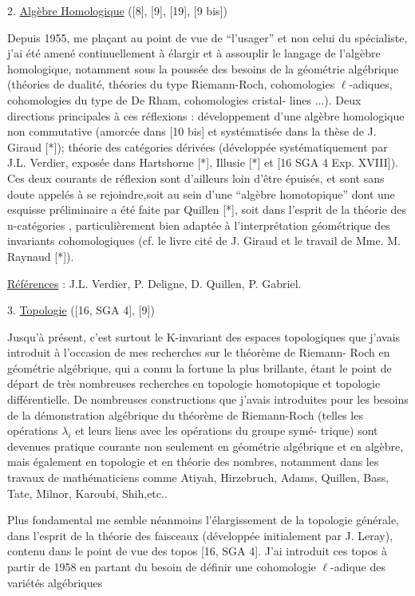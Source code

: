 
2. \uline{Algèbre Homologique} ([8], [9], [19], [9 bis])

Depuis 1955, me plaçant au point de vue de ``l'usager'' et non celui
du spécialiste, j'ai été amené continuellement à élargir et à assouplir le
langage de l'algèbre homologique, notamment sous la poussée des besoins de la
géométrie algébrique (théories de dualité, théories du type Riemann-Roch,
cohomologies $\ell$-adiques, cohomologies du type de De Rham, cohomologies cristal-%
lines ...). Deux directions principales à ces réflexions  : développement d'une
algèbre homologique non commutative (amorcée dans [10 bis] et systématisée
dans la thèse de J. Giraud [*]); théorie des catégories dérivées (développée
systématiquement par J.L. Verdier, exposée dans Hartshorne [*], Illusie [*]
et [16 SGA 4 Exp. XVIII]). Ces deux courants de réflexion sont d'ailleurs loin
d'être épuisés, et sont sans doute appelés à se rejoindre,soit au sein d'une
``algèbre homotopique'' dont une esquisse préliminaire a été faite par Quillen
[*], soit dans l'esprit de la théorie des n-catégories , particulièrement bien
adaptée à l'interprétation géométrique des invariants cohomologiques (cf. le
livre cité de J. Giraud et le travail de Mme. M. Raynaud [*]).

\uline{Références} : J.L. Verdier, P. Deligne, D. Quillen, P. Gabriel.

3. \uline{Topologie} ([16, SGA 4], [9])

Jusqu'à présent, c'est surtout le K-invariant des espaces topologiques
que j'avais introduit à l'occasion de mes recherches sur le théorème de Riemann-%
Roch en géométrie algébrique, qui a connu la fortune\unsure{,} la plus brillante, étant
le point de départ de très nombreuses recherches en topologie homotopique et
topologie différentielle. De nombreuses constructions que j'avais introduites
pour les besoins de la démonstration algébrique du théorème de Riemann-Roch
(telles les opérations  $\lambda_i$  et leurs liens avec les opérations du groupe symé-%
trique) sont devenues pratique courante non seulement en géométrie algébrique
et en algèbre, mais également en topologie et en théorie des nombres, notamment
dans les travaux de mathématiciens comme Atiyah, Hirzebruch, Adams, Quillen,
Bass, Tate, Milnor, Karoubi, Shih,etc..

Plus fondamental me semble néanmoins  l'élargissement de la
topologie générale, dans l'esprit de la théorie des faisceaux (développée
initialement par J. Leray), contenu dans le point de vue des topos
[16, SGA 4]. J'ai introduit ces topos à partir de 1958 en partant du
besoin de définir une cohomologie  $\ell$-adique  des variétés algébriques

